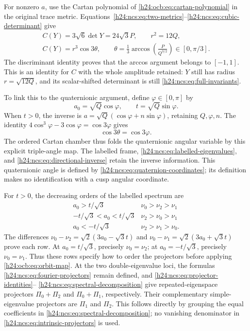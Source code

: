 For nonzero $a$, use the Cartan polynomial of
\eqref{h24:ocb:eq:cartan-polynomial} in the original trace metric.
Equations~\eqref{h24:ncs:eq:two-metrics}--\eqref{h24:ncs:eq:cubic-determinant}
give
\begin{equation}
 \begin{gathered}
 C(Y)=3\sqrt6\det Y=24\sqrt3P,\qquad r^2=12Q,\\
 \boxed{C(Y)=r^3\cos3\theta,\qquad
 \theta=\frac13\arccos\left(\frac{P}{Q^{3/2}}\right)
                              \in[0,\pi/3].}
 \end{gathered}
 \label{h24:ncs:eq:cartan-angle}\tag{NCS17}
\end{equation}
The discriminant identity proves that the arccos argument belongs
to $[-1,1]$. This is an identity for $C$ with the whole amplitude
retained: $Y$ still has radius $r=\sqrt{12Q}$, and its scalar-shifted
determinant is still \eqref{h24:ncs:eq:full-invariants}.

To link this to the quaternionic argument, define
$\varphi\in[0,\pi]$ by
\[
 a_0=\sqrt Q\cos\varphi,\qquad t=\sqrt Q\sin\varphi.
\]
When $t>0$, the inverse is
$a=\sqrt Q(\cos\varphi+n\sin\varphi)$, retaining
$Q,\varphi,n$. The identity
$4\cos^3\varphi-3\cos\varphi=\cos3\varphi$ gives
\begin{equation}
 \cos3\theta=\cos3\varphi.
 \label{h24:ncs:eq:quaternion-angle}\tag{NCS18}
\end{equation}
The ordered Cartan chamber thus folds the quaternionic angular
variable by this explicit triple-angle map. The labelled frame,
\eqref{h24:ncs:eq:labelled-eigenvalues}, and
\eqref{h24:ncs:eq:directional-inverse} retain the inverse information.
This quaternionic angle is defined by
\eqref{h24:ncs:eq:quaternion-coordinates}; its definition makes no
identification with a cusp angular coordinate.

For $t>0$, the decreasing orders of the labelled spectrum are
\begin{equation}
 \begin{array}{c|c}
 a_0>t/\sqrt3&\nu_0>\nu_2>\nu_1\\
 -t/\sqrt3<a_0<t/\sqrt3&\nu_2>\nu_0>\nu_1\\
 a_0<-t/\sqrt3&\nu_2>\nu_1>\nu_0.
 \end{array}
 \label{h24:ncs:eq:ordered-chambers}\tag{NCS19}
\end{equation}
The differences
$\nu_0-\nu_2=\sqrt2(3a_0-\sqrt3t)$ and
$\nu_0-\nu_1=\sqrt2(3a_0+\sqrt3t)$ prove each row.
At $a_0=t/\sqrt3$, precisely $\nu_0=\nu_2$; at
$a_0=-t/\sqrt3$, precisely $\nu_0=\nu_1$. Thus these
rows specify how to order the projectors before applying
\eqref{h24:ocb:eq:orbit-map}. At the two double-eigenvalue loci,
the formulas \eqref{h24:ncs:eq:fourier-projectors} remain defined,
and \eqref{h24:ncs:eq:projector-identities}--
\eqref{h24:ncs:eq:spectral-decomposition} give repeated-eigenspace
projectors $\Pi_0+\Pi_2$ and $\Pi_0+\Pi_1$, respectively.
Their complementary simple-eigenvalue projectors are $\Pi_1$
and $\Pi_2$. This follows directly by grouping the equal
coefficients in \eqref{h24:ncs:eq:spectral-decomposition}; no
vanishing denominator in \eqref{h24:ncs:eq:intrinsic-projectors}
is used.

